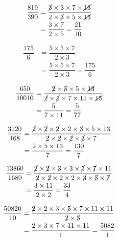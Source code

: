 {{\item\begin{align*}
    \dfrac{819}{390} &=
    \dfrac{\cancel{3} \times 3 \times 7 \times \cancel{13}}
    {2 \times \cancel{3} \times 5 \times \cancel{13}}\\ &=
    \dfrac{3 \times 7}
    {2 \times 5} =
    \dfrac{21}{10}
    \end{align*}

\item\begin{align*}
    \dfrac{175}{6} &=
    \dfrac{5 \times 5 \times 7}
    {2 \times 3}\\ &=
    \dfrac{5 \times 5 \times 7}
    {2 \times 3} =
    \dfrac{175}{6}
    \end{align*}

\item\begin{align*}
    \dfrac{650}{10010} &=
    \dfrac{\cancel{2} \times \cancel{5} \times 5 \times \cancel{13}}
    {\cancel{2} \times \cancel{5} \times 7 \times 11 \times \cancel{13}}\\ &=
    \dfrac{5}
    {7 \times 11} =
    \dfrac{5}{77}
    \end{align*}

\item\begin{align*}
    \dfrac{3120}{168} &=
    \dfrac{\cancel{2} \times \cancel{2} \times \cancel{2} \times 2 \times \cancel{3} \times 5 \times 13}
    {\cancel{2} \times \cancel{2} \times \cancel{2} \times \cancel{3} \times 7}\\ &=
    \dfrac{2 \times 5 \times 13}
    {7} =
    \dfrac{130}{7}
    \end{align*}

\item\begin{align*}
    \dfrac{13860}{1680} &=
    \dfrac{\cancel{2} \times \cancel{2} \times \cancel{3} \times 3 \times \cancel{5} \times \cancel{7} \times 11}
    {\cancel{2} \times \cancel{2} \times 2 \times 2 \times \cancel{3} \times \cancel{5} \times \cancel{7}}\\ &=
    \dfrac{3 \times 11}
    {2 \times 2} =
    \dfrac{33}{4}
    \end{align*}

\item\begin{align*}
    \dfrac{50820}{10} &=
    \dfrac{\cancel{2} \times 2 \times 3 \times \cancel{5} \times 7 \times 11 \times 11}
    {\cancel{2} \times \cancel{5}}\\ &=
    \dfrac{2 \times 3 \times 7 \times 11 \times 11}
    {1} =
    \dfrac{5082}{1}
    \end{align*}

}}
